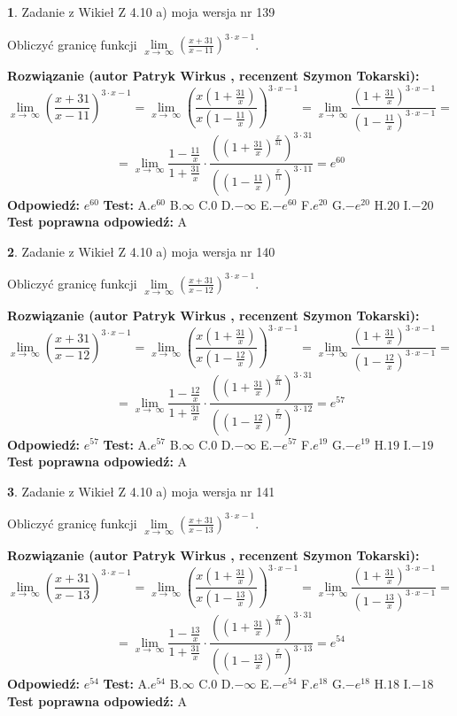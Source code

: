 \documentclass[12pt, a4paper]{article}
\theoremstyle{definition} %
\newtheorem{zad}{}
\newcommand{\zadStart}[1]{\begin{zad}#1\newline}
\newcommand{\zadStop}{\end{zad}}
\newcommand{\rozwStart}[2]{\noindent \textbf{Rozwiązanie (autor #1 , recenzent #2): }\newline}
\newcommand{\rozwStop}{\newline}
\newcommand{\odpStart}{\noindent \textbf{Odpowiedź:}\newline}
\newcommand{\odpStop}{\newline}
\newcommand{\testStart}{\noindent \textbf{Test:}\newline}
\newcommand{\testStop}{\newline}
\newcommand{\kluczStart}{\noindent \textbf{Test poprawna odpowiedź:}\newline}
\newcommand{\kluczStop}{\newline}
\begin{document}
\zadStart{Zadanie z Wikieł Z 4.10 a) moja wersja nr 139}

Obliczyć granicę funkcji  $\lim\limits_{x\to\ \infty}(\frac{x+31}{x-11})^{3\cdot x-1}$.
\zadStop
\rozwStart{Patryk Wirkus}{Szymon Tokarski}
$$\lim\limits_{x\to\ \infty}(\frac{x+31}{x-11})^{3\cdot x-1} = \lim\limits_{x\to\ \infty}(\frac{x(1+\frac{31}{x})}{x(1-\frac{11}{x})})^{3\cdot x-1}=\lim\limits_{x\to\ \infty}\frac{(1+\frac{31}{x})^{3\cdot x-1}}{(1-\frac{11}{x})^{3\cdot x-1}}=$$
$$=\lim\limits_{x\to\ \infty}\frac{1-\frac{11}{x}}{1+\frac{31}{x}}\cdot\frac{((1+\frac{31}{x})^{\frac{x}{31}})^{3\cdot31}}{((1-\frac{11}{x})^{\frac{x}{11}})^{3\cdot11}}=e^{60}$$
\rozwStop
\odpStart
$e^{60}$
\odpStop
\testStart
A.$e^{60}$ B.$\infty$ C.$0$ D.$-\infty$ E.$-e^{60}$
F.$e^{20}$ G.$-e^{20}$
H.$20$
I.$-20$
\testStop
\kluczStart
A
\kluczStop



\zadStart{Zadanie z Wikieł Z 4.10 a) moja wersja nr 140}

Obliczyć granicę funkcji  $\lim\limits_{x\to\ \infty}(\frac{x+31}{x-12})^{3\cdot x-1}$.
\zadStop
\rozwStart{Patryk Wirkus}{Szymon Tokarski}
$$\lim\limits_{x\to\ \infty}(\frac{x+31}{x-12})^{3\cdot x-1} = \lim\limits_{x\to\ \infty}(\frac{x(1+\frac{31}{x})}{x(1-\frac{12}{x})})^{3\cdot x-1}=\lim\limits_{x\to\ \infty}\frac{(1+\frac{31}{x})^{3\cdot x-1}}{(1-\frac{12}{x})^{3\cdot x-1}}=$$
$$=\lim\limits_{x\to\ \infty}\frac{1-\frac{12}{x}}{1+\frac{31}{x}}\cdot\frac{((1+\frac{31}{x})^{\frac{x}{31}})^{3\cdot31}}{((1-\frac{12}{x})^{\frac{x}{12}})^{3\cdot12}}=e^{57}$$
\rozwStop
\odpStart
$e^{57}$
\odpStop
\testStart
A.$e^{57}$ B.$\infty$ C.$0$ D.$-\infty$ E.$-e^{57}$
F.$e^{19}$ G.$-e^{19}$
H.$19$
I.$-19$
\testStop
\kluczStart
A
\kluczStop



\zadStart{Zadanie z Wikieł Z 4.10 a) moja wersja nr 141}

Obliczyć granicę funkcji  $\lim\limits_{x\to\ \infty}(\frac{x+31}{x-13})^{3\cdot x-1}$.
\zadStop
\rozwStart{Patryk Wirkus}{Szymon Tokarski}
$$\lim\limits_{x\to\ \infty}(\frac{x+31}{x-13})^{3\cdot x-1} = \lim\limits_{x\to\ \infty}(\frac{x(1+\frac{31}{x})}{x(1-\frac{13}{x})})^{3\cdot x-1}=\lim\limits_{x\to\ \infty}\frac{(1+\frac{31}{x})^{3\cdot x-1}}{(1-\frac{13}{x})^{3\cdot x-1}}=$$
$$=\lim\limits_{x\to\ \infty}\frac{1-\frac{13}{x}}{1+\frac{31}{x}}\cdot\frac{((1+\frac{31}{x})^{\frac{x}{31}})^{3\cdot31}}{((1-\frac{13}{x})^{\frac{x}{13}})^{3\cdot13}}=e^{54}$$
\rozwStop
\odpStart
$e^{54}$
\odpStop
\testStart
A.$e^{54}$ B.$\infty$ C.$0$ D.$-\infty$ E.$-e^{54}$
F.$e^{18}$ G.$-e^{18}$
H.$18$
I.$-18$
\testStop
\kluczStart
A
\kluczStop
\end{document}
